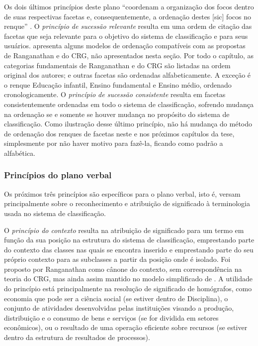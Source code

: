 Os dois últimos princípios deste plano ``coordenam a organização dos focos dentro de suas respectivas facetas e, consequentemente, a ordenação destes [sic] focos no renque'' \cite[p. 68]{lima04spiteri}. O \emph{princípio de sucessão relevante} resulta em uma ordem de citação das facetas que seja relevante para o objetivo do sistema de classificação e para seus usuários.  apresenta alguns modelos de ordenação compatíveis com as propostas de Ranganathan e do CRG, não apresentados nesta seção. Por todo o capítulo, as categorias fundamentais de Ranganathan e do CRG são listadas na ordem original dos autores; e outras facetas são ordenadas alfabeticamente. A exceção é o renque Educação infantil, Ensino fundamental e Ensino médio, ordenado cronologicamente. O \emph{princípio de sucessão consistente} resulta em facetas consistentemente ordenadas em todo o sistema de classificação, sofrendo mudança na ordenação se e somente se houver mudança no propósito do sistema de classificação. Como ilustração desse último princípio, não há mudança do método de ordenação dos renques de facetas neste e nos próximos capítulos da tese, simplesmente por não haver motivo para fazê-la, ficando como padrão a alfabética.

\subsubsection{Princípios do plano verbal}
\label{planoVerbal}

Os próximos três princípios são específicos para o plano verbal, isto é, versam principalmente sobre o reconhecimento e atribuição de significado à terminologia usada no sistema de classificação.

O \emph{princípio do contexto} resulta na atribuição de significado para um termo em função da sua posição na estrutura do sistema de classificação, emprestando parte do contexto das classes nas quais se encontra inserido e emprestando parte do seu próprio contexto para as subclasses a partir da posição onde é isolado. Foi proposto por Ranganathan como cânone do contexto, sem correspondência na teoria do CRG, mas ainda assim mantido no modelo simplificado de . A utilidade do princípio está principalmente na resolução de significado de homógrafos, como economia que pode ser a ciência social (se estiver dentro de Disciplina), o conjunto de atividades desenvolvidas pelas instituições visando a produção, distribuição e o consumo de bens e serviços (se for dividida em setores econômicos), ou o resultado de uma operação eficiente sobre recursos (se estiver dentro da estrutura de resultados de processos).

